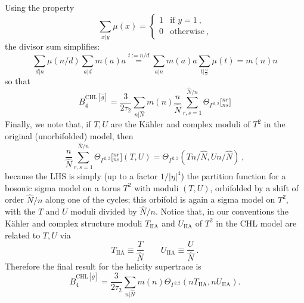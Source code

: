 \documentclass[a4paper,11pt]{article}
\numberwithin{equation}{section}
\def\be{\begin{equation}}
\def\ee{\end{equation}}
\begin{document}
 Using the property
\be \sum_{x|y}\mu(x)=\begin{cases}1 &\text{if }y=1\ ,\\ 0 &\text{otherwise}\ ,\end{cases}
\ee
the divisor sum simplifies:
\be \sum_{d|n} \mu(n/d)\sum_{a|d}m(a)a\stackrel{t:=n/d}{=}\sum_{a|n}m(a) a\sum_{t|\frac{n}{a}}\mu(t)=m(n)n
\ee so that
\be B_4^{\text{CHL}[\hat g]}=\frac{3}{2\tau_2}\sum_{n|\hat N}m(n)\frac{n}{\hat N}\sum_{r,s=1}^{ \hat N/n}\Theta_{\Gamma^{2,2}} \bigl[{}^{nr}_{ns}\bigr]
\ee
Finally, we note that, if $T,U$ are the K\"ahler and complex moduli of $T^2$ in the original (unorbifolded) model, then
\be \frac{n}{\hat N}\sum_{r,s=1}^{ \hat N/n}\Theta_{\Gamma^{2,2}} \bigl[{}^{nr}_{ns}\bigr](T,U)=\Theta_{\Gamma^{2,2}}(Tn/\hat N,Un/\hat N)\ ,
\ee because the LHS is simply (up to a factor $1/|\eta|^4$)  the partition function for a bosonic sigma model on a torus $T^2$ with moduli $(T,U)$, orbifolded by a shift of order $\hat N/n$ along one of the cycles; this orbifold is again a sigma model on $T^2$, with the $T$ and $U$ moduli divided by $\hat N/n$. Notice that, in our conventions the K\"ahler and complex structure moduli $T_{\text{IIA}}$ and $U_{\text{IIA}}$ of $T^2$ in the CHL model are related to $T,U$ via
\be T_{\text{IIA}}\equiv \frac{T}{\hat N}\qquad U_{\text{IIA}}\equiv \frac{U}{\hat N}\ .
\ee
Therefore the final result for the helicity supertrace is
\be B_4^{\text{CHL}[\hat g]}=\frac{3}{2\tau_2}\sum_{n|\hat N}m(n)\Theta_{\Gamma^{2,2}}(nT_{\text{IIA}},nU_{\text{IIA}}).
\ee 
 
\end{document}
